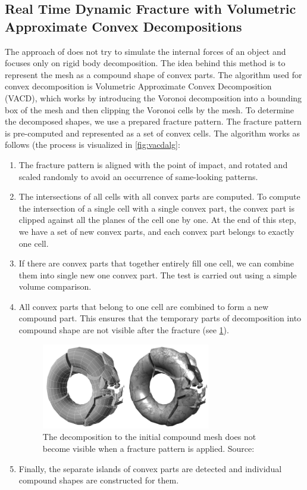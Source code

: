 \subsection{Real Time Dynamic Fracture
with Volumetric Approximate Convex Decompositions}
\label{sec:RTDF}
The approach of \citet{nvidia} does not try to simulate the internal forces of an object and focuses only on rigid body decomposition. The idea behind this method is to represent the mesh as a compound shape of convex parts. The algorithm used for convex decomposition is Volumetric Approximate Convex Decomposition (VACD), which works by introducing the Voronoi decomposition into a bounding box of the mesh and then clipping the Voronoi cells by the mesh. To determine the decomposed shapes, we use a prepared fracture pattern. The fracture pattern is pre-computed and represented as a set of convex cells. The algorithm works as follows (the process is visualized in \cref{fig:vacdalg}:
\begin{enumerate}
\item The fracture pattern is aligned with the point of impact, and rotated and scaled randomly to avoid an occurrence of same-looking patterns.
\item The intersections of all cells with all convex parts are computed. To compute the intersection of a single cell with a single convex part, the convex part is clipped against all the planes of the cell one by one. 
At the end of this step, we have a set of new convex parts, and each convex part belongs to exactly one cell.
\item If there are convex parts that together entirely fill one cell, we can combine them into single new one convex part. The test is carried out using a simple volume comparison.
\item All convex parts that belong to one cell are combined to form a new compound part. This ensures that the temporary parts of decomposition into compound shape are not visible after the fracture (see \cref{fig:vacdfracture}).
\begin{figure}
        \centering
        \includegraphics[width=0.7\textwidth]{img/vacdfracture}
        \caption{The decomposition to the
initial compound mesh does not become visible when a fracture
pattern is applied. Source: \citet{nvidia}}
        \label{fig:vacdfracture}
\end{figure}
\item Finally, the separate islands of convex parts are detected and individual compound shapes are constructed for them.
\end{enumerate}

